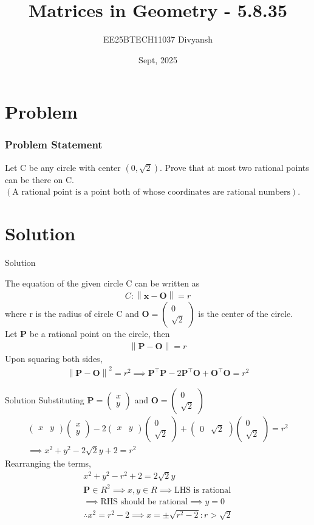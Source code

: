 \documentclass{beamer}
\title{Matrices in Geometry - 5.8.35}
\author{EE25BTECH11037  Divyansh}
\date{Sept, 2025}
\let\vec\mathbf
\providecommand{\brak}[1]{\ensuremath{\left(#1\right)}}
\theoremstyle{remark}
\providecommand{\norm}[1]{\left\lVert#1\right\rVert}
\newcommand{\myvec}[1]{\ensuremath{\begin{pmatrix}#1\end{pmatrix}}}
\begin{document}
\maketitle


\section{Problem}
\begin{frame}
\frametitle{Problem Statement}
Let C be any circle with center $\brak{0, \sqrt{2}}$. Prove that at most two rational points can be there on C.  \brak{\text{A rational point is a point both of whose coordinates are rational numbers}}.
\end{frame}

\section{Solution}
\begin{frame}{Solution}
   
The equation of the given circle C can be written as 
\begin{align}
    C: \norm{\vec{x}-\vec{O}}=r
\end{align}
where r is the radius of circle C and $\vec{O}=\myvec{0\\\sqrt{2}}$ is the center of the circle.\\
Let $\vec{P}$ be a rational point on the circle, then
\begin{align}
    \norm{\vec{P} - \vec{O}} = r
\end{align}
Upon squaring both sides,
\begin{align}
    \norm{\vec{P} - \vec{O}}^2 = r^2 \implies \vec{P}^{\top}\vec{P} - 2\vec{P}^{\top}\vec{O} + \vec{O}^{\top}\vec{O} = r^2
\end{align}
\end{frame}

\begin{frame}{Solution}
Substituting $\vec{P}=\myvec{x \\ y}$ and $\vec{O}=\myvec{0 \\ \sqrt{2}}$
\begin{align}
    \myvec{x & y}\myvec{x \\ y} - 2 \myvec{x&y}\myvec{0 \\ \sqrt{2}} + \myvec{0 & \sqrt{2}}\myvec{0 \\ \sqrt{2}} = r^2\\
    \implies x^2 + y^2 - 2\sqrt{2}y + 2=r^2
\end{align}
Rearranging the terms,
\begin{align}
    x^2 + y^2 -r^2 + 2=2\sqrt{2}y\\
    \vec{P} \in R^2 \implies x, y \in R \implies \text{LHS is rational}\\ \implies \text{RHS should be rational} 
    \implies y=0 \\
    \therefore x^2 = r^2 -2 \implies x = \pm \sqrt{r^2 - 2}: r>\sqrt{2}
\end{align}
\end{frame}
\end{document}
